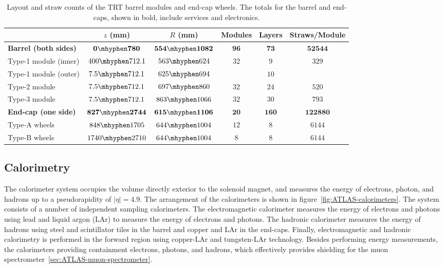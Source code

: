 \begin{table}[htbp]
	\centering
	\begin{tabular}{|l|c|c|c|c|c|}
		\hline
		 & $z$ (mm) & $R$ (mm) & Modules & Layers & Straws/Module \\
		 \hline
		 \textbf{Barrel (both sides)} & $\mathbf{0\mhyphen780}$ & $\mathbf{554\mhyphen1082}$ & $\mathbf{96}$ & $\mathbf{73}$ & $\mathbf{52544}$ \\
		 Type-1 module (inner) & $400\mhyphen712.1$ & $563\mhyphen624$ & \multirow{2}{*}{$32$} & $9$ & \multirow{2}{*}{$329$} \\
		 Type-1 module (outer) & $7.5\mhyphen712.1$ & $625\mhyphen 694$ & & $10$ & \\
		 Type-2 module & $7.5\mhyphen 712.1$ & $697\mhyphen860$ & $32$ & $24$ & $520$ \\
		 Type-3 module & $7.5\mhyphen 712.1$ & $863\mhyphen 1066$ & $32$ & $30$ & $793$ \\
		 \hline
		 \textbf{End-cap (one side)} & $\mathbf{827\mhyphen 2744}$ & $\mathbf{615\mhyphen1106}$ & $\mathbf{20}$ & $\mathbf{160}$ & $\mathbf{122880}$ \\
		 Type-A wheels & $848\mhyphen1705$ & $644\mhyphen1004$ & $12$ & $8$ & $6144$ \\
		 Type-B wheels & $1740\mhyphen2710$ & $644\mhyphen1004$ & $8$ & $8$ & $6144$ \\
		 \hline
	\end{tabular}
	\caption{Layout and straw counts of the TRT barrel modules and end-cap wheels. The totals for the barrel and end-caps, shown in bold, include services and electronics.}	
	\label{table:ATLAS-TRT-layout}
\end{table}


\subsection{Calorimetry}\label{sec:ATLAS-calorimeters}
The calorimeter system occupies the volume directly exterior to the solenoid magnet, and measures the energy of electrons, photon, and hadrons up to a pseudorapidity of $|\eta|=4.9$. The arrangement of the calorimeters is shown in figure~\ref{fig:ATLAS-calorimeters}. The system consists of a number of independent sampling calorimeters. The electromagnetic calorimeter measures the energy of electrons and photons using lead and liquid argon (LAr) to measure the energy of electrons and photons. The hadronic calorimeter measures the energy of hadrons using steel and scintillator tiles in the barrel and copper and LAr in the end-caps. Finally, electromagnetic and hadronic calorimetry is performed in the forward region using copper-LAr and tungsten-LAr technology. Besides performing energy measurements, the calorimeters providing containment electrons, photons, and hadrons, which effectively provides shielding for the muon spectrometer~\ref{sec:ATLAS-muon-spectrometer}. 


